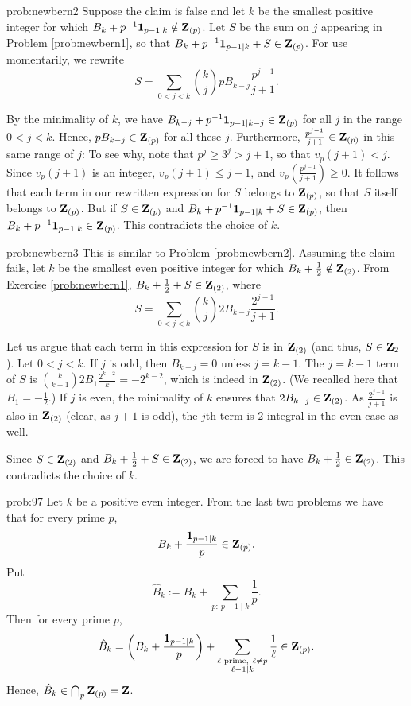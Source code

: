 \begin{sol}{prob:newbern2} Suppose the claim is false and let $k$ be the smallest positive integer for which $B_k + p^{-1}\mathbf{1}_{p-1\mid k} \notin \mathbf{Z}_{(p)}$. Let $S$ be the sum on $j$ appearing in Problem \ref{prob:newbern1}, so that $B_k + p^{-1}\mathbf{1}_{p-1\mid k} + S \in \mathbf{Z}_{(p)}$. For use momentarily, we rewrite
\[ S = \sum_{0 < j < k} \binom{k}{j} p B_{k-j} \frac{p^{j-1}}{j+1}.\]

By the minimality of $k$, we have $B_{k-j} + p^{-1}\mathbf{1}_{p-1\mid k-j} \in \mathbf{Z}_{(p)}$ for all $j$ in the range $0 < j < k$. Hence, $pB_{k-j} \in \mathbf{Z}_{(p)}$ for all these $j$. Furthermore, $\frac{p^{j-1}}{j+1} \in \mathbf{Z}_{(p)}$ in this same range of $j$: To see why, note that $p^j \ge 3^j > j+1$, so that  $v_p(j+1) < j$. Since $v_p(j+1)$ is an integer, $v_p(j+1) \le j-1$, and $v_p(\frac{p^{j-1}}{j+1})\ge 0$. It follows that each term in our rewritten expression for $S$ belongs to $\mathbf{Z}_{(p)}$, so that $S$ itself belongs to $\mathbf{Z}_{(p)}$. But if $S \in \mathbf{Z}_{(p)}$ and $B_k + p^{-1}\mathbf{1}_{p-1\mid k} + S \in \mathbf{Z}_{(p)}$, then $B_k + p^{-1}\mathbf{1}_{p-1\mid k} \in \mathbf{Z}_{(p)}$. This contradicts the choice of $k$.
\end{sol}


\begin{sol}{prob:newbern3} This is similar to Problem \ref{prob:newbern2}. Assuming the claim fails, let $k$ be the smallest even positive integer for which $B_{k}+\frac{1}{2}\notin \mathbf{Z}_{(2)}$. From Exercise \ref{prob:newbern1}, $B_{k}+\frac{1}{2} + S\in \mathbf{Z}_{(2)}$, where \[ S=\sum_{0 < j < k} \binom{k}{j} 2B_{k-j}  \frac{2^{j-1}}{j+1}. \]

Let us argue that each term in this expression for $S$ is in $\mathbf{Z}_{(2)}$ (and thus, $S \in \mathbf{Z}_2$). Let $0 < j < k$. If $j$ is odd, then $B_{k-j}=0$ unless $j=k-1$. The $j=k-1$ term of $S$ is $\binom{k}{k-1} 2B_{1} \frac{2^{k-2}}{k} = -2^{k-2}$, which is indeed in $\mathbf{Z}_{(2)}$. (We recalled here that $B_1 = -\frac12$.) If $j$ is even, the minimality of $k$ ensures that $2B_{k-j} \in \mathbf{Z}_{(2)}$. As $\frac{2^{j-1}}{j+1}$ is also in $\mathbf{Z}_{(2)}$ (clear, as $j+1$ is odd), the $j$th term is $2$-integral in the even case as well.

Since $S \in \mathbf{Z}_{(2)}$ and $B_{k}+\frac{1}{2}+S \in \mathbf{Z}_{(2)}$, we are forced to have $B_{k}+\frac{1}{2}\in \mathbf{Z}_{(2)}$. This contradicts the choice of $k$.
\end{sol}


\begin{sol}{prob:97} Let $k$ be a positive even integer. From the last two problems we have that for every prime $p$,
\[ B_k +\frac{\mathbf{1}_{p-1\mid k}}{p}  \in \mathbf{Z}_{(p)}. \]
Put
\[ \hat{B}_k := B_k + \sum_{p:~p-1\mid k}\frac{1}{p}.\]
Then for every prime $p$,
\[ \hat{B}_k = \left(B_k + \frac{\mathbf{1}_{p-1\mid k}}{p}\right) +  \sum_{\substack{\ell\text{ prime},~\ell\ne p \\ \ell-1\mid k}} \frac{1}{\ell} \in \mathbf{Z}_{(p)}.  \]
Hence, $\hat{B}_k \in \bigcap_{p} \mathbf{Z}_{(p)} = \mathbf{Z}$.
\end{sol}

